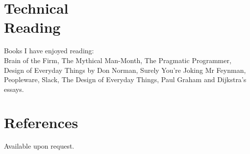 \documentclass[line,margin]{res}
\begin{document}
\begin{resume}
\section{Technical \\ Reading}
Books I have enjoyed reading: \\
Brain of the Firm,
The Mythical Man-Month, %
The Pragmatic Programmer,
Design of Everyday Things by Don Norman,
Surely You're Joking Mr Feynman,
Peopleware, %
Slack,
The Design of Everyday Things,
Paul Graham and Dijkstra's essays.

\section{References}
Available upon request.




\end{resume}
\end{document}
